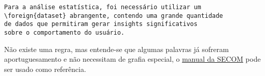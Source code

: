 \begin{lstlisting}[float=htb, style=latexStyle, caption={Tabela}, label=lst:loanword]
Para a análise estatística, foi necessário utilizar um 
\foreign{dataset} abrangente, contendo uma grande quantidade 
de dados que permitiram gerar insights significativos 
sobre o comportamento do usuário.
\end{lstlisting}

Não existe uma regra, mas entende-se que algumas palavras já sofreram aportuguesamento e não necessitam de grafia especial, o \href{https://www12.senado.leg.br/manualdecomunicacao/verbetes-acessorio/estrangeirismos-grafados-sem-italico-ou-aspas}{manual da SECOM} pode ser usado como referência.

